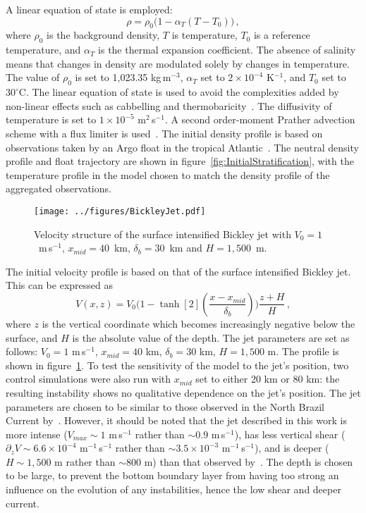 A linear equation of state is employed:
\begin{equation}
    \rho = \rho_{0} \big(1 - \alpha_T (T - T_0 )\big) \, ,
    \label{eq:EOS}
\end{equation}
where $\rho_{0}$ is the background density, $T$ is temperature, $T_0$ is a reference temperature, and $\alpha_T$ is the thermal expansion coefficient. The absence of salinity means that changes in density are modulated solely by changes in temperature. The value of $\rho_{0}$ is set to 1,023.35 kg$\,$m$^{-3}$, $\alpha_T$  set to $2 \times 10^{-4}$ K$^{-1}$, and $T_0$ set to $30^{\circ}$C. The linear equation of state is used to avoid the complexities added by non-linear effects such as cabbelling and thermobaricity~\citep[e.g.][]{Groeskamp2016}. The diffusivity of temperature is set to $1 \times 10^{-5}$ m$^2$\,s$^{-1}$. A second order-moment Prather advection scheme with a flux limiter is used~\citep{Prather1986}. The initial density profile is based on observations taken by an Argo float in the tropical Atlantic~\citep{Argo2022}. The neutral density profile and float trajectory are shown in figure~\ref{fig:InitialStratification}, with the temperature profile in the model chosen to match the density profile of the aggregated observations.

\begin{figure}[t]
    \centering
    \texttt{[image: ../figures/BickleyJet.pdf]}
    \caption{Velocity structure of the surface intensified Bickley jet with $V_0 = 1$~m$\,$s$^{-1}$, $x_{mid} = 40$~km, $\delta_b = 30$~km and $H = 1,500$~m.}
    \label{fig:SurfIntBickleyJet}
\end{figure}

The initial velocity profile is based on that of the surface intensified Bickley jet. This can be expressed as
\begin{equation}
    V(x, z) = V_0 \Bigg( 1 - \tanh[2](\frac{x - x_{mid}}{\delta_b})\Bigg) \frac{z + H}{H} \, ,
\end{equation}
where $z$ is the vertical coordinate which becomes increasingly negative below the surface, and $H$ is the absolute value of the depth. The jet parameters are set as follows: $V_0 = 1$ m\,s$^{-1}$, $x_{mid} = 40$ km, $\delta_b = 30$ km, $H = 1,500$ m. The profile is shown in figure~\ref{fig:SurfIntBickleyJet}. To test the sensitivity of the model to the jet's position, two control simulations were also run with $x_{mid}$ set to either 20 km or 80 km: the resulting instability shows no qualitative dependence on the jet's position. The jet parameters are chosen to be similar to those observed in the North Brazil Current by~\citet{Johns1998}. However, it should be noted that the jet described in this work is more intense ($V_{max} \sim 1$ m\,s$^{-1}$ rather than $\sim 0.9$ m\,s$^{-1}$), has less vertical shear ($\partial_z V \sim 6.6\times 10^{-4}$ m$^{-1}$\,s$^{-1}$ rather than $\sim 3.5 \times 10^{-3}$ m$^{-1}$\,s$^{-1}$), and is deeper ($H\sim 1,500$ m rather than $\sim 800$ m) than that observed by~\citet{Johns1998}. The depth is chosen to be large, to prevent the bottom boundary layer from having too strong an influence on the evolution of any instabilities, hence the low shear and deeper current.

